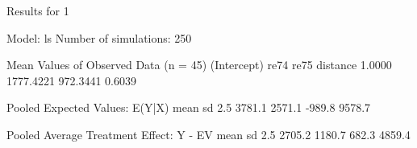 \begin{enumerate}
\begin{Schunk}
\begin{Soutput}
Results for 1 

  Model: ls 
  Number of simulations: 250 

Mean Values of Observed Data (n = 45) 
(Intercept)        re74        re75    distance 
     1.0000   1777.4221    972.3441      0.6039 

Pooled Expected Values: E(Y|X)
  mean     sd   2.5%  97.5% 
3781.1 2571.1 -989.8 9578.7 

Pooled Average Treatment Effect: Y - EV
  mean     sd   2.5%  97.5% 
2705.2 1180.7  682.3 4859.4 


\end{Soutput}
\end{Schunk}
  
\end{enumerate}

